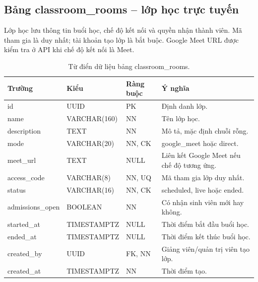 \subsection{Bảng classroom\_rooms -- lớp học trực tuyến}
Lớp học lưu thông tin buổi học, chế độ kết nối và quyền nhận thành viên.
Mã tham gia là duy nhất; tài khoản tạo lớp là bắt buộc. Google Meet URL
được kiểm tra ở API khi chế độ kết nối là Meet.
\begin{table}[H]
\centering
\caption{Từ điển dữ liệu bảng classroom\_rooms.}
\label{tab:dict-classroom-rooms}
\begin{tabularx}{\textwidth}{>{\ttfamily\color{daumaroon}}p{}p{}p{}X}
\toprule
\rowcolor{gray100}Trường & Kiểu & Ràng buộc & Ý nghĩa \\
\midrule
id & UUID & PK & Định danh lớp. \\
name & VARCHAR(160) & NN & Tên lớp học. \\
description & TEXT & NN & Mô tả, mặc định chuỗi rỗng. \\
mode & VARCHAR(20) & NN, CK & google\_meet hoặc direct. \\
meet\_url & TEXT & NULL & Liên kết Google Meet nếu chế độ tương ứng. \\
access\_code & VARCHAR(8) & NN, UQ & Mã tham gia lớp duy nhất. \\
status & VARCHAR(16) & NN, CK & scheduled, live hoặc ended. \\
admissions\_open & BOOLEAN & NN & Có nhận sinh viên mới hay không. \\
started\_at & TIMESTAMPTZ & NULL & Thời điểm bắt đầu buổi học. \\
ended\_at & TIMESTAMPTZ & NULL & Thời điểm kết thúc buổi học. \\
created\_by & UUID & FK, NN & Giảng viên/quản trị viên tạo lớp. \\
created\_at & TIMESTAMPTZ & NN & Thời điểm tạo. \\
\bottomrule
\end{tabularx}
\end{table}

